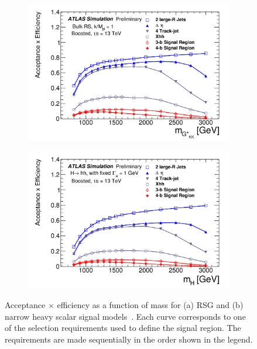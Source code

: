 \begin{figure}[h!]
  \centering
  \captionsetup{justification=centering}

   \begin{subfigure}[t]{0.5\textwidth}
        \centering
        \includegraphics[width=\textwidth]{figures/4b_eff_RSG}
        \caption{}
    \end{subfigure}%
    \begin{subfigure}[t]{0.5\textwidth}
        \centering
        \includegraphics[width=\textwidth]{figures/4b_eff_H}
        \caption{}
    \end{subfigure}

   \caption{Acceptance $\times$ efficiency as a function of mass for (a) RSG and (b) narrow heavy scalar signal models~\cite{4bconf}. Each curve corresponds to one of the selection requirements used to define the signal region. The requirements are made sequentially in the order shown in the legend.}
  \label{fig:4beff}
\end{figure}

